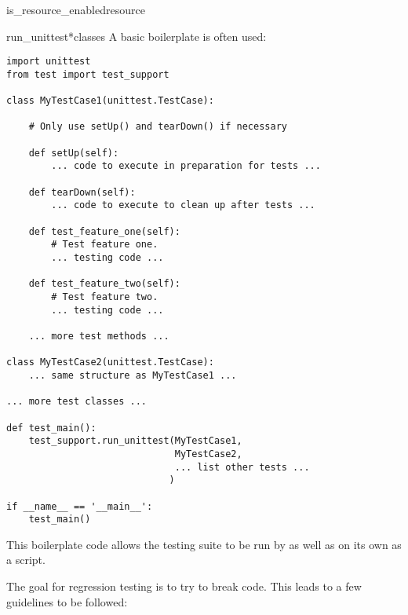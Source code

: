 \begin{funcdesc}{is_resource_enabled}{resource}
\begin{funcdesc}{run_unittest}{*classes}
A basic boilerplate is often used:

\begin{verbatim}
import unittest
from test import test_support

class MyTestCase1(unittest.TestCase):

    # Only use setUp() and tearDown() if necessary

    def setUp(self):
        ... code to execute in preparation for tests ...

    def tearDown(self):
        ... code to execute to clean up after tests ...

    def test_feature_one(self):
        # Test feature one.
        ... testing code ...

    def test_feature_two(self):
        # Test feature two.
        ... testing code ...

    ... more test methods ...

class MyTestCase2(unittest.TestCase):
    ... same structure as MyTestCase1 ...

... more test classes ...

def test_main():
    test_support.run_unittest(MyTestCase1,
                              MyTestCase2,
                              ... list other tests ...
                             )

if __name__ == '__main__':
    test_main()
\end{verbatim}

This boilerplate code allows the testing suite to be run by 
as well as on its own as a script.

The goal for regression testing is to try to break code.
This leads to a few guidelines to be followed:


\end{funcdesc}
\end{funcdesc}
